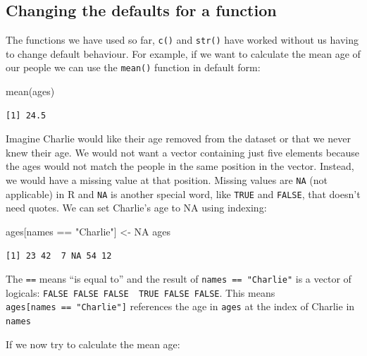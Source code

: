 \documentclass[
  letterpaper,
  DIV=11,
  numbers=noendperiod]{scrreprt}
\newenvironment{Shaded}{\begin{snugshade}}{\end{snugshade}}
\newcommand{\ConstantTok}[1]{\textcolor[rgb]{0.56,0.35,0.01}{#1}}
\newcommand{\FunctionTok}[1]{\textcolor[rgb]{0.28,0.35,0.67}{#1}}
\newcommand{\NormalTok}[1]{\textcolor[rgb]{0.00,0.23,0.31}{#1}}
\newcommand{\OtherTok}[1]{\textcolor[rgb]{0.00,0.23,0.31}{#1}}
\newcommand{\SpecialCharTok}[1]{\textcolor[rgb]{0.37,0.37,0.37}{#1}}
\newcommand{\StringTok}[1]{\textcolor[rgb]{0.13,0.47,0.30}{#1}}
\begin{document}
\hypertarget{changing-the-defaults-for-a-function}{%
\subsection{Changing the defaults for a
function}\label{changing-the-defaults-for-a-function}}

The functions we have used so far, \texttt{c()} and \texttt{str()} have
worked without us having to change default behaviour. For example, if we
want to calculate the mean age of our people we can use the
\texttt{mean()} function in default form:

\begin{Shaded}
\begin{Highlighting}[]
\FunctionTok{mean}\NormalTok{(ages)}
\end{Highlighting}
\end{Shaded}

\begin{verbatim}
[1] 24.5
\end{verbatim}

Imagine Charlie would like their age removed from the dataset or that we
never knew their age. We would not want a vector containing just five
elements because the ages would not match the people in the same
position in the vector. Instead, we would have a missing value at that
position. Missing values are \texttt{NA} (not applicable) in R and
\texttt{NA} is another special word, like \texttt{TRUE} and
\texttt{FALSE}, that doesn't need quotes. We can set Charlie's age to NA
using indexing:

\begin{Shaded}
\begin{Highlighting}[]
\NormalTok{ages[names }\SpecialCharTok{==} \StringTok{"Charlie"}\NormalTok{] }\OtherTok{\textless{}{-}} \ConstantTok{NA}
\NormalTok{ages}
\end{Highlighting}
\end{Shaded}

\begin{verbatim}
[1] 23 42  7 NA 54 12
\end{verbatim}

The \texttt{==} means ``is equal to'' and the result of
\texttt{names\ ==\ "Charlie"} is a vector of logicals:
\texttt{FALSE\ FALSE\ FALSE\ \ TRUE\ FALSE\ FALSE}. This means
\texttt{ages{[}names\ ==\ "Charlie"{]}} references the age in
\texttt{ages} at the index of Charlie in \texttt{names}

If we now try to calculate the mean age:
\end{document}
